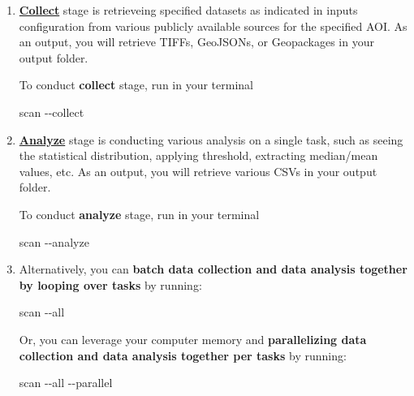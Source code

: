\documentclass[
  letterpaper,
  DIV=11,
  numbers=noendperiod]{scrreprt}
\newenvironment{Shaded}{\begin{snugshade}}{\end{snugshade}}
\newcommand{\AttributeTok}[1]{\textcolor[rgb]{0.40,0.45,0.13}{#1}}
\newcommand{\ExtensionTok}[1]{\textcolor[rgb]{0.00,0.23,0.31}{#1}}
\begin{document}
\begin{enumerate}
\def\labelenumi{\arabic{enumi}.}
\item
  \href{running-first-cityscan.qmd}{\textbf{Collect}} stage is
  retrieveing specified datasets as indicated in inputs configuration
  from various publicly available sources for the specified AOI. As an
  output, you will retrieve TIFFs, GeoJSONs, or Geopackages in your
  output folder.

  To conduct \textbf{collect} stage, run in your terminal

\begin{Shaded}
\begin{Highlighting}[]
\ExtensionTok{scan} \AttributeTok{{-}{-}collect}
\end{Highlighting}
\end{Shaded}
\item
  \href{running-first-cityscan.qmd}{\textbf{Analyze}} stage is
  conducting various analysis on a single task, such as seeing the
  statistical distribution, applying threshold, extracting median/mean
  values, etc. As an output, you will retrieve various CSVs in your
  output folder.

  To conduct \textbf{analyze} stage, run in your terminal

\begin{Shaded}
\begin{Highlighting}[]
\ExtensionTok{scan} \AttributeTok{{-}{-}analyze}
\end{Highlighting}
\end{Shaded}
\item
  Alternatively, you can \textbf{batch data collection and data analysis
  together by looping over tasks} by running:

\begin{Shaded}
\begin{Highlighting}[]
\ExtensionTok{scan} \AttributeTok{{-}{-}all}
\end{Highlighting}
\end{Shaded}

  Or, you can leverage your computer memory and \textbf{parallelizing
  data collection and data analysis together per tasks} by running:

\begin{Shaded}
\begin{Highlighting}[]
\ExtensionTok{scan} \AttributeTok{{-}{-}all} \AttributeTok{{-}{-}parallel}
\end{Highlighting}
\end{Shaded}
\end{enumerate}
\end{document}
